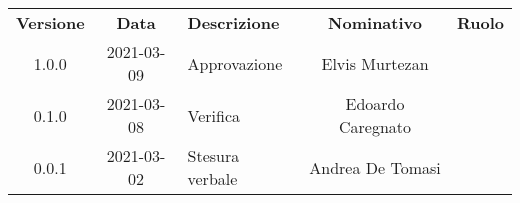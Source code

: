 {
    \renewcommand{\arraystretch}{1.5}
    \centering
    \begin{longtable}{ c c  C{4cm}  c  c }
        \rowcolor{\primaryColor}
        \textcolor{\secondaryColor}{
        \textbf{Versione}}     & \textcolor{\secondaryColor}{\textbf{Data}}       & \textcolor{\secondaryColor}
        {\textbf{Descrizione}} & \textcolor{\secondaryColor}{\textbf{Nominativo}} & \textcolor{\secondaryColor}{\textbf{Ruolo}}                          \\


        1.0.0                  & 2021-03-09                                       & Approvazione                                & Elvis Murtezan & \redattore{} \\
        0.1.0                  & 2021-03-08                                       & Verifica                                & Edoardo Caregnato & \redattore{} \\
        0.0.1                  & 2021-03-02                                       & Stesura verbale                                & Andrea De Tomasi & \redattore{} \\
    \end{longtable}
}